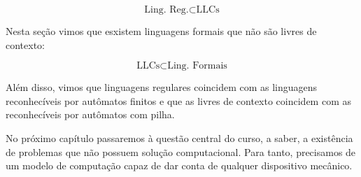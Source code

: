 \begin{displaymath}
  \textrm{Ling. Reg.} \subset \textrm{LLCs}
\end{displaymath}

Nesta seção vimos que esxistem linguagens formais que não são livres de contexto:

\begin{displaymath}
  \textrm{LLCs} \subset \textrm{Ling. Formais}
\end{displaymath}

Além disso, vimos que linguagens regulares coincidem com as linguagens reconhecíveis por autômatos finitos e que as livres de contexto coincidem com as reconhecíveis por autômatos com pilha.

No próximo capítulo passaremos à questão central do curso, a saber, a existência de problemas que não possuem solução computacional.
Para tanto, precisamos de um modelo de computação capaz de dar conta de qualquer dispositivo mecânico.
